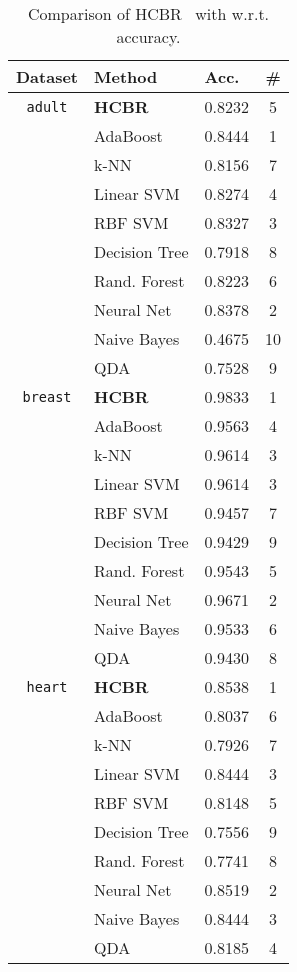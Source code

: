 \def\HCBR{{\sc HCBR}}
\def\bfHCBR{{\sc \bf HCBR}}
\begin{table}[h!]
  \caption{Comparison of \HCBR~ with w.r.t. accuracy. }
\fontsize{10pt}{12pt}\selectfont 
\begin{tabular}{|c|l|l|c|}
\hline
 Dataset & Method & Acc. & \#  \\ \hline

\multirow{}{}{\texttt{adult}} & \bfHCBR & 0.8232 & 5 \\
& AdaBoost & 0.8444  & 1 \\
& k-NN & 0.8156 & 7 \\
& Linear SVM & 0.8274 & 4\\
& RBF SVM & 0.8327 & 3 \\
& Decision Tree & 0.7918  & 8 \\
& Rand. Forest & 0.8223 & 6 \\
& Neural Net & 0.8378  & 2 \\
& Naive Bayes & 0.4675 & 10\\
& QDA & 0.7528  & 9 \\ \hline

\multirow{}{}{\texttt{breast}} & \bfHCBR & 0.9833 & 1 \\
& AdaBoost & 0.9563 & 4\\
& k-NN & 0.9614 & 3 \\
& Linear SVM & 0.9614 & 3\\
& RBF SVM & 0.9457 & 7 \\
& Decision Tree & 0.9429 & 9 \\
& Rand. Forest & 0.9543 & 5\\
& Neural Net & 0.9671 & 2\\
& Naive Bayes & 0.9533 & 6\\
& QDA & 0.9430 & 8 \\ \hline

\multirow{}{}{\texttt{heart}} & \bfHCBR & 0.8538 & 1 \\
& AdaBoost & 0.8037  &  6\\
& k-NN & 0.7926 & 7 \\
& Linear SVM & 0.8444 & 3\\
& RBF SVM & 0.8148 & 5 \\
& Decision Tree & 0.7556  & 9 \\
& Rand. Forest &0.7741 & 8 \\
& Neural Net & 0.8519 & 2\\
& Naive Bayes & 0.8444 & 3\\
& QDA & 0.8185 & 4\\ \hline


\end{tabular}
\end{table}
